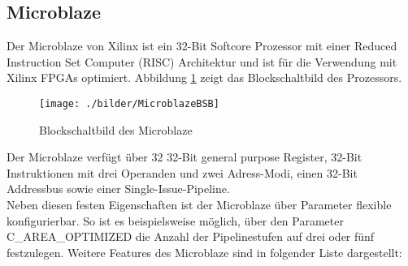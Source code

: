 \subsection{Microblaze}
Der Microblaze von Xilinx ist ein 32-Bit Softcore Prozessor mit einer Reduced Instruction Set Computer (RISC) Architektur und ist für die Verwendung mit Xilinx FPGAs optimiert. Abbildung \ref{fig:MicroblazeBSB} zeigt das Blockschaltbild des Prozessors.\\ %
\begin{figure}[h!]
\centering
\texttt{[image: ./bilder/MicroblazeBSB]}
\caption{Blockschaltbild des Microblaze}
\label{fig:MicroblazeBSB}
\end{figure}
\noindent
Der Microblaze verfügt über 32 32-Bit general purpose Register, 32-Bit Instruktionen mit drei Operanden und zwei Adress-Modi, einen
32-Bit Addressbus sowie einer Single-Issue-Pipeline.\\
Neben diesen festen Eigenschaften ist der Microblaze über Parameter flexible konfigurierbar. So ist es beispielsweise möglich, über den Parameter C\_AREA\_OPTIMIZED die Anzahl der Pipelinestufen auf drei oder fünf festzulegen. Weitere Features des Microblaze sind in folgender Liste dargestellt:\\
